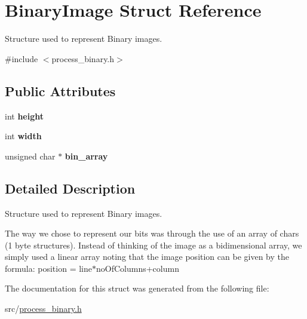 \hypertarget{structBinaryImage}{}\section{Binary\+Image Struct Reference}
\label{structBinaryImage}


Structure used to represent Binary images.  




{\ttfamily \#include $<$process\+\_\+binary.\+h$>$}

\subsection*{Public Attributes}
\begin{DoxyCompactItemize}
\item 
\mbox{\label{structBinaryImage_a042b6bf1e87ee45018a389fb7f87e799}} 
int {\bfseries height}
\item 
\mbox{\label{structBinaryImage_a3eb878acd5c384ee3a75eb513c773727}} 
int {\bfseries width}
\item 
\mbox{\label{structBinaryImage_ad32926fc56f17faec21ed17b27e460a4}} 
unsigned char $\ast$ {\bfseries bin\+\_\+array}
\end{DoxyCompactItemize}


\subsection{Detailed Description}
Structure used to represent Binary images. 

The way we chose to represent our bits was through the use of an array of chars (1 byte structures). Instead of thinking of the image as a bidimensional array, we simply used a linear array noting that the image position can be given by the formula\+: position = line$\ast$no\+Of\+Columns+column 

The documentation for this struct was generated from the following file\+:\begin{DoxyCompactItemize}
\item 
src/\hyperlink{process__binary_8h}{process\+\_\+binary.\+h}\end{DoxyCompactItemize}
